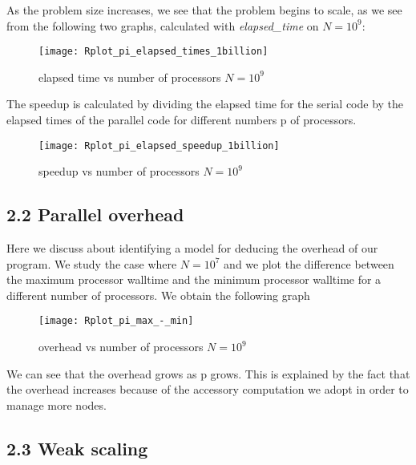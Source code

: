 \documentclass[11pt]{scrartcl} %
\begin{document}
As the problem size increases, we see that the problem begins to scale, as we see from the following two graphs, calculated with \textit{elapsed\_time} on $N=10^9$:
\begin{figure}[H] %
	\centering
	\texttt{[image: Rplot\_pi\_elapsed\_times\_1billion]} %
	\caption{elapsed time vs number of processors $N= 10^9$}
\end{figure}
The speedup is calculated by dividing the elapsed time for the serial code by the elapsed times of the parallel code for different numbers p of processors. 
\begin{figure}[H] %
	\centering
	\texttt{[image: Rplot\_pi\_elapsed\_speedup\_1billion]} %
	\caption{speedup vs number of processors $N= 10^9$}
\end{figure}
\subsection{2.2 Parallel overhead}

Here we discuss about identifying a model for deducing the overhead of our program. We study the case where $N=10^7$ and we plot the difference between the maximum processor walltime
 and the minimum processor walltime for a different number of processors.
We obtain the following graph
\begin{figure}[H] %
	\centering
	\texttt{[image: Rplot\_pi\_max\_-\_min]} %
	\caption{overhead vs number of processors $N= 10^9$}
\end{figure}

We can see that the overhead grows as p grows. This is explained by the fact that the overhead increases because of the accessory computation we adopt in order to manage more nodes.
\subsection{2.3 Weak scaling}
\end{document}
